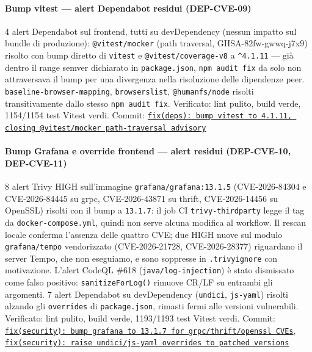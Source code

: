 ﻿\documentclass[a4paper,12pt]{report}
\newcommand{\commitref}[2]{\texttt{\small \href{https://github.com/diegoandruccioli/hotel-pms/commit/#1}{#2}}}
\begin{document}
\paragraph{Bump vitest --- alert Dependabot residui (DEP-CVE-09)}
4 alert Dependabot sul frontend, tutti su devDependency (nessun impatto sul
bundle di produzione): \texttt{@vitest/mocker} (path traversal,
GHSA-82fw-gwwq-j7x9) risolto con bump diretto di \texttt{vitest} e
\texttt{@vitest/coverage-v8} a \texttt{\^{}4.1.11} --- già dentro il range
semver dichiarato in \texttt{package.json}, \texttt{npm audit fix} da solo
non attraversava il bump per una divergenza nella risoluzione delle
dipendenze peer. \texttt{baseline-browser-mapping}, \texttt{browserslist},
\texttt{@humanfs/node} risolti transitivamente dallo stesso
\texttt{npm audit fix}. Verificato: lint pulito, build verde, 1154/1154 test
Vitest verdi.
Commit: \commitref{209354e}{fix(deps): bump vitest to 4.1.11, closing @vitest/mocker path-traversal advisory}

\paragraph{Bump Grafana e override frontend --- alert residui (DEP-CVE-10, DEP-CVE-11)}
8 alert Trivy HIGH sull'immagine \texttt{grafana/grafana:13.1.5}
(CVE-2026-84304 e CVE-2026-84445 su grpc, CVE-2026-43871 su thrift,
CVE-2026-14456 su OpenSSL) risolti con il bump a \texttt{13.1.7}: il job CI
\texttt{trivy-thirdparty} legge il tag da \texttt{docker-compose.yml}, quindi
non serve alcuna modifica al workflow. Il rescan locale conferma l'assenza
delle quattro CVE; due HIGH nuove sul modulo \texttt{grafana/tempo}
vendorizzato (CVE-2026-21728, CVE-2026-28377) riguardano il server Tempo, che
non eseguiamo, e sono soppresse in \texttt{.trivyignore} con motivazione.
L'alert CodeQL \#618 (\texttt{java/log-injection}) è stato dismissato come
falso positivo: \texttt{sanitizeForLog()} rimuove CR/LF su entrambi gli
argomenti. 7 alert Dependabot su devDependency (\texttt{undici},
\texttt{js-yaml}) risolti alzando gli \texttt{overrides} di
\texttt{package.json}, rimasti fermi alle versioni vulnerabili. Verificato:
lint pulito, build verde, 1193/1193 test Vitest verdi.
Commit: \commitref{7ff622c}{fix(security): bump grafana to 13.1.7 for grpc/thrift/openssl CVEs},
\commitref{587d637}{fix(security): raise undici/js-yaml overrides to patched versions}
\end{document}
